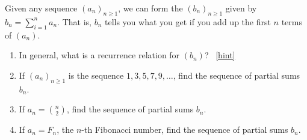 \documentclass{book}
\begin{document}
\setcounter{project}{145}
\addtocounter{project}{-1}
\begin{activity}[]\label{activity-138}
\hypertarget{p-970}{}%
Given any sequence \((a_n)_{n \ge 1}\), we can form the  \((b_n)_{n \ge 1}\) given by \(b_n = \sum_{i = 1}^n a_n\).  That is, \(b_n\) tells you what you get if you add up the first \(n\) terms of \((a_n)\).%
\begin{enumerate}[font=\bfseries,label=(\alph*),ref=\alph*]
\item\label{task-176} \hypertarget{p-971}{}%
In general, what is a recurrence relation for \((b_n)\)?%
~\hfill{\tiny\hyperlink{a-145.a}{[hint]}\hypertarget{q-145.a}{}}\item\label{task-177} \hypertarget{p-973}{}%
If \((a_n)_{n \ge 1}\) is the sequence \(1, 3, 5, 7, 9, \ldots\), find the sequence of partial sums \(b_n\).%
\item\label{task-178} \hypertarget{p-974}{}%
If \(a_n = \binom{n}{2}\), find the sequence of partial sums \(b_n\).%
\item\label{task-179} \hypertarget{p-975}{}%
If \(a_n = F_n\), the \(n\)-th Fibonacci number, find the sequence of partial sums \(b_n\).%
\end{enumerate}
\end{activity}
\end{document}

